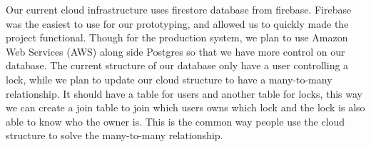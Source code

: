 Our current cloud infrastructure uses firestore database from firebase. Firebase was the easiest to use for our prototyping, and allowed us to quickly made the project functional. Though for the production system, we plan to use Amazon Web Services (AWS) along side Postgres so that we have more control on our database.  The current structure of our database only have a user controlling a lock, while we plan to update our cloud structure to have a many-to-many relationship. It should have a table for users and another table for locks, this way we can create a join table to join which users owns which lock and the lock is also able to know who the owner is. This is the common way people use the cloud structure to solve the many-to-many relationship.


